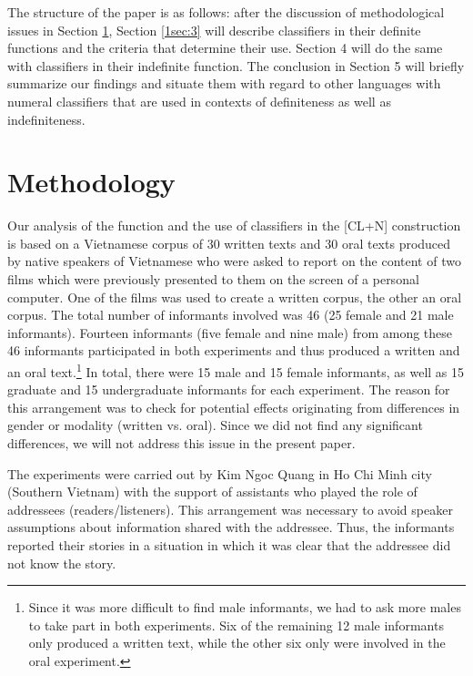 \documentclass[output=paper]{langsci/langscibook}
\begin{document}
{
The structure of the paper is as follows: after the discussion of methodological issues in Section \ref{1sec:2}, Section \ref{1sec:3} will describe classifiers in their definite functions and the criteria that determine their use. Section 4 will do the same with classifiers in their indefinite function. The conclusion in Section 5 will briefly summarize our findings and situate them with regard to other languages with numeral classifiers that are used in contexts of definiteness as well as indefiniteness.
}

\section{Methodology}\label{1sec:2}

Our analysis of the function and the use of classifiers in the [CL+N] construction is based on a Vietnamese corpus of 30 written texts and 30 oral texts produced by native speakers of Vietnamese who were asked to report on the content of two films which were previously presented to them on the screen of a personal computer. One of the films was used to create a written corpus, the other an oral corpus. The total number of informants involved was 46 (25 female and 21 male informants). Fourteen informants (five female and nine male) from among these 46 informants participated in both experiments and thus produced a written and an oral text.\footnote{Since it was more difficult to find male informants, we had to ask more males to take part in both experiments. Six of the remaining 12 male informants only produced a written text, while the other six only were involved in the oral experiment.} In total, there were 15 male and 15 female informants, as well as 15 graduate and 15 undergraduate informants for each experiment. The reason for this arrangement was to check for potential effects originating from differences in gender or modality (written vs. oral). Since we did not find any significant differences, we will not address this issue in the present paper.

The experiments were carried out by Kim Ngoc Quang in Ho Chi Minh city (Southern Vietnam) with the support of assistants who played the role of addressees (readers/listeners). This arrangement was necessary to avoid speaker assumptions about information shared with the addressee. Thus, the informants reported their stories in a situation in which it was clear that the addressee did not know the story.
\end{document}
